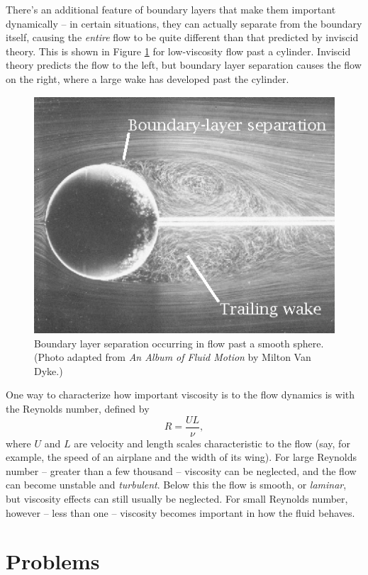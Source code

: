 There's an additional feature of boundary layers that make them important dynamically -- in certain situations, they can actually separate from the boundary itself, causing the \emph{entire} flow to be quite different than that predicted by inviscid theory.  This is shown in Figure \ref{fig_boundary_sep} for low-viscosity flow past a cylinder.  Inviscid theory predicts the flow to the left, but boundary layer separation causes the flow on the right, where a large wake has developed past the cylinder.

\begin{figure}[t]
\centering\includegraphics[width=0.5\linewidth]{Figures/Chapter1/fig_boundary_layer_sep.png}
\caption{Boundary layer separation occurring in flow past a smooth sphere.  (Photo adapted from \emph{An Album of Fluid Motion} by Milton Van Dyke.) }
\label{fig_boundary_sep}
\end{figure}

One way to characterize how important viscosity is to the flow dynamics is with the Reynolds number, defined by
\begin{equation}
R = \frac{UL}{\nu},
\end{equation}
where $U$ and $L$ are velocity and length scales characteristic to the flow (say, for example, the speed of an airplane and the width of its wing).  For large Reynolds number -- greater than a few thousand -- viscosity can be neglected, and the flow can become unstable and \emph{turbulent}.  Below this the flow is smooth, or \emph{laminar}, but viscosity effects can still usually be neglected.  For small Reynolds number, however -- less than one -- viscosity becomes important in how the fluid behaves.









\section*{Problems}

